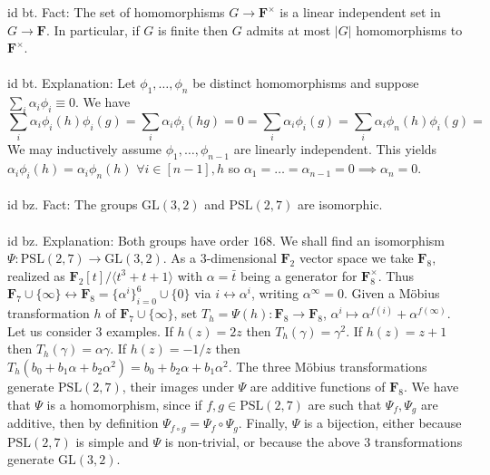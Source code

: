 \documentclass[oneside]{book}
\newcommand{\F}{\mathbf{F}}
\newcommand{\GL}{\mathrm{GL}}\newcommand{\SL}{\mathrm{SL}}
\newcommand{\PSL}{\mathrm{PSL}}
\newcommand{\set}[1]{\{ #1\}}
\newcommand{\gen}[1]{\langle #1\rangle}
\newcommand{\abs}[1]{\left\lvert #1\right\rvert}
\begin{document}
id bt. Fact: The set of homomorphisms $G\to\F^\times$ is a linear independent set in $G\to \F$. In particular, if $G$ is finite then $G$ admits at most $\abs{G}$ homomorphisms to $\F^\times$. \\\\


id bt. Explanation: Let $\phi_1,\dots,\phi_n$ be distinct homomorphisms and suppose $\sum_i \alpha_i\phi_i\equiv 0$. We have 
$$\sum_i \alpha_i\phi_i(h)\phi_i(g)=\sum_i \alpha_i\phi_i(hg)=0=\sum_i \alpha_i\phi_i(g)=\sum_i \alpha_i\phi_n(h)\phi_i(g)=$$
We may inductively assume $\phi_1,\dots,\phi_{n-1}$ are linearly independent. This yields $\alpha_i\phi_i(h)=\alpha_i\phi_n(h)$ $\forall i\in[n-1], h$ so $\alpha_1=\dots=\alpha_{n-1}=0\implies \alpha_n=0$.\\\\


id bz. Fact: The groups $\GL(3,2)$ and $\PSL(2,7)$ are isomorphic.  \\\\


id bz. Explanation: Both groups have order $168$. We shall find an isomorphism $\Psi:\PSL(2,7)\to\GL(3,2)$. As a $3$-dimensional $\F_2$ vector space we take $\F_8$, realized as $\F_2[t]/\gen{t^3+t+1}$ with $\alpha=\bar{t}$ being a generator for $\F_8^\times$. Thus ${\F_7}\cup\set{\infty}\longleftrightarrow\F_8=\set{\alpha^i}_{i=0}^6\cup\set{0}$ via $i\longleftrightarrow \alpha^i$, writing $\alpha^\infty=0$. Given a Möbius transformation $h$ of ${\F_7}\cup\set{\infty}$, set $T_h=\Psi(h):\F_8\to\F_8$, $\alpha^i\mapsto \alpha^{f(i)}+\alpha^{f(\infty)}$. Let us consider $3$ examples. If $h(z)=2z$ then $T_h(\gamma)=\gamma^2$. If $h(z)=z+1$ then $T_h(\gamma)=\alpha\gamma$. If $h(z)=-1/z$ then $T_h(b_0+b_1\alpha+b_2\alpha^2)=b_0+b_2\alpha+b_1\alpha^2$. The three Möbius transformations generate $\PSL(2,7)$, their images under $\Psi$ are additive functions of $\F_8$. We have that $\Psi$ is a homomorphism, since if  $f,g\in\PSL(2,7)$ are such that $\Psi_f,\Psi_g$ are additive, then by definition $\Psi_{f\circ g}=\Psi_f\circ\Psi_g$. Finally, $\Psi$ is a bijection, either because $\PSL(2,7)$ is simple and $\Psi$ is non-trivial, or because the above $3$ transformations generate $\GL(3,2)$. \\\\
\end{document}
